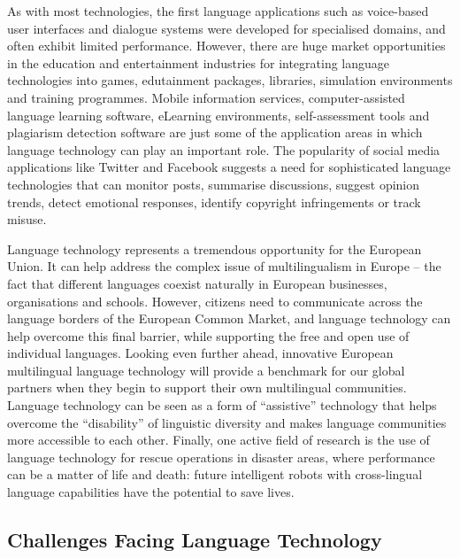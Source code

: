 \documentclass[]{../metanetpaper}
\begin{document}
\begin{multicols}{2}
As with most technologies, the first language applications such as voice-based user interfaces and dialogue systems were developed for specialised domains, and often exhibit limited performance. However, there are huge market opportunities in the education and entertainment industries for integrating language technologies into games, edutainment packages, libraries, simulation environments and training programmes. Mobile information services, computer-assisted language learning software, eLearning environments, self-assessment tools and plagiarism detection software are just some of the application areas in which language technology can play an important role. The popularity of social media applications like Twitter and Facebook suggests a need for sophisticated language technologies that can monitor posts, summarise discussions, suggest opinion trends, detect emotional responses, identify copyright infringements or track misuse.


Language technology represents a tremendous opportunity for the European Union. It can help address the complex issue of multilingualism in Europe – the fact that different languages coexist naturally in European businesses, organisations and schools. However, citizens need to communicate across the language borders of the European Common Market, and language technology can help overcome this final barrier, while supporting the free and open use of individual languages. Looking even further ahead, innovative European multilingual language technology will provide a benchmark for our global partners when they begin to support their own multilingual communities. Language technology can be seen as a form of “assistive” technology that helps overcome the “disability” of linguistic diversity and makes language communities more accessible to each other. Finally, one active field of research is the use of language technology for rescue operations in disaster areas, where performance can be a matter of life and death: future intelligent robots with cross-lingual language capabilities have the potential to save lives.

\subsection{Challenges Facing Language Technology}


\end{multicols}
\end{document}
